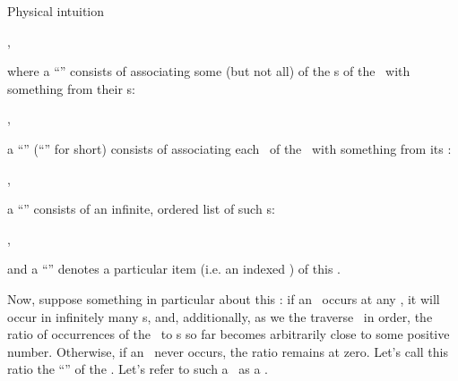 \begin{part} {Physical intuition}
\begin{center}
,
  \end{center}
  where a ``\masn'' consists of associating some (but not all) of the \var{}s of the \spt\ 
  with something from their \dmn{}s:
  \begin{center}
    ,
  \end{center}
  a ``\jasn'' (``\asn'' for short) consists of associating each \var\ of the \spt\ with something from its \dmn:
  \def\tjasn#1#2#3#4#5{
    \tvar{#1}{#5}   {\AV}{#3}
    \tvar{#2}{($#5 + (0,-1.6)$)}{\BV}{#4}
  }
  \begin{center}
    ,
  \end{center}
  a ``\seq'' consists of an infinite, ordered list of such \jasn{}s:
  \begin{center}
    ,
  \end{center}
  and a ``\trl'' denotes a particular item (i.e. an indexed \jasn) of this \seq.

  Now, suppose something in particular about this \seq:
  if an \jasn\ occurs at any \trl, it will occur in infinitely many \trl{}s,
  and, additionally, as we the traverse \seq\ in order, the ratio of occurrences of the
  \jasn\ to \trl{}s so far becomes arbitrarily close to 
  some positive number. 
  Otherwise, if an \jasn\ never occurs, the ratio remains at zero.
  Let's call this ratio the ``\sprb'' of the \jasn.
  Let's refer to such a \seq\ as a \pseq.


\end{part}
